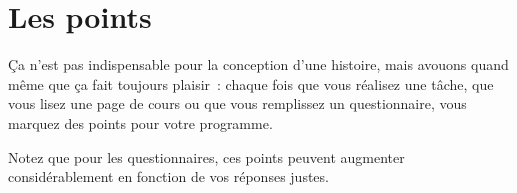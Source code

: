 % 
% 
% 
% 
% 
% 
% 
% 

\chapter{Les points}\hypertarget{explication-nombre-points}{}\label{explication-nombre-points}

Ça n'est pas indispensable pour la conception d'une histoire, mais avouons quand même que ça fait toujours plaisir~{}: chaque fois que vous réalisez une tâche, que vous lisez une page de cours ou que vous remplissez un questionnaire, vous marquez des points pour votre programme.

Notez que pour les questionnaires, ces points peuvent augmenter considérablement en fonction de vos réponses justes.

